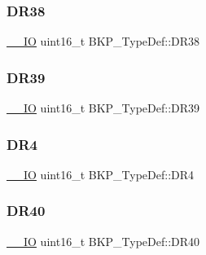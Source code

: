 \mbox{\label{struct_b_k_p___type_def_accfaf41ee048545b7c9c0ed069165c6e}} 
\subsubsection{\texorpdfstring{DR38}{DR38}}
{\footnotesize\ttfamily \mbox{\hyperlink{group___c_m_s_i_s___c_m3__core__definitions_gaec43007d9998a0a0e01faede4133d6be}{\+\_\+\+\_\+\+IO}} uint16\+\_\+t B\+K\+P\+\_\+\+Type\+Def\+::\+D\+R38}

\mbox{\label{struct_b_k_p___type_def_a599452e0f9d6e1e1fa75730aec9228fd}} 
\subsubsection{\texorpdfstring{DR39}{DR39}}
{\footnotesize\ttfamily \mbox{\hyperlink{group___c_m_s_i_s___c_m3__core__definitions_gaec43007d9998a0a0e01faede4133d6be}{\+\_\+\+\_\+\+IO}} uint16\+\_\+t B\+K\+P\+\_\+\+Type\+Def\+::\+D\+R39}

\mbox{\label{struct_b_k_p___type_def_a02abe76a58a7f018ea450221c955ab30}} 
\subsubsection{\texorpdfstring{DR4}{DR4}}
{\footnotesize\ttfamily \mbox{\hyperlink{group___c_m_s_i_s___c_m3__core__definitions_gaec43007d9998a0a0e01faede4133d6be}{\+\_\+\+\_\+\+IO}} uint16\+\_\+t B\+K\+P\+\_\+\+Type\+Def\+::\+D\+R4}

\mbox{\label{struct_b_k_p___type_def_a1811cf03bde48bc9becc8795d3e09d7f}} 
\subsubsection{\texorpdfstring{DR40}{DR40}}
{\footnotesize\ttfamily \mbox{\hyperlink{group___c_m_s_i_s___c_m3__core__definitions_gaec43007d9998a0a0e01faede4133d6be}{\+\_\+\+\_\+\+IO}} uint16\+\_\+t B\+K\+P\+\_\+\+Type\+Def\+::\+D\+R40}

